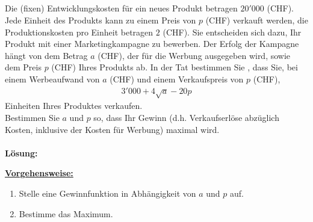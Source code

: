 \subsection*{}
Die (fixen) Entwicklungskosten für ein neues Produkt betragen $ 20'000 $ (CHF).
Jede Einheit des Produkts kann zu einem Preis von $ p $ (CHF) verkauft werden, 
die Produktionskosten pro Einheit betragen $ 2 $ (CHF).
Sie entscheiden sich dazu, Ihr Produkt mit einer Marketingkampagne zu bewerben.
Der Erfolg der Kampagne hängt von dem Betrag $ a $ (CHF),
der für die Werbung ausgegeben wird, sowie dem Preis $ p $ (CHF) Ihres Produkts ab.
In der Tat bestimmen Sie , dass Sie, bei einem Werbeaufwand von $ a $ (CHF) und einem Verkaufspreis von $ p $ (CHF),
\begin{align*}
3'000 + 4 \sqrt{a} - 20 p
\end{align*}
Einheiten Ihres Produktes verkaufen.\\
Bestimmen Sie $ a $ und $ p $ so, dass Ihr Gewinn (d.h. Verkaufserlöse abzüglich Kosten, inklusive der Kosten für Werbung) maximal wird.
\\ \\
\textbf{Lösung:}
\begin{mdframed}
\underline{\textbf{Vorgehensweise:}}
\begin{enumerate}
\item Stelle eine Gewinnfunktion in Abhängigkeit von $ a $ und $ p $ auf.
\item Bestimme das Maximum.
\end{enumerate}
\end{mdframed}

